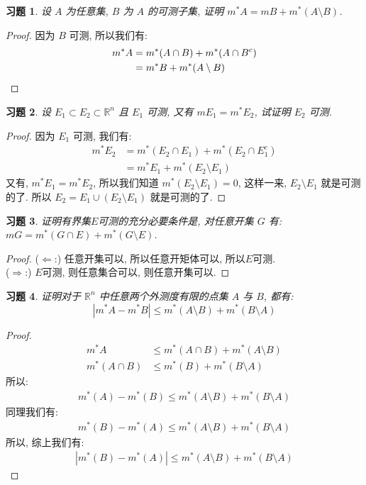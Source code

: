 \documentclass{article}
\newtheorem{exercise}{习题}
\begin{document}
\begin{exercise}
  设 $A$ 为任意集, $B$ 为 $A$ 的可测子集, 证明 $m^*A = mB + m^*(A\setminus B)$.
\end{exercise}
\begin{proof}
  因为 $B$ 可测, 所以我们有:
  \begin{align*}
  m^*A &= m^*(A\cap B) + m^*(A\cap B^c) \\
   &= m^*B + m^*(A\setminus B) \qedhere 
  \end{align*}
\end{proof}
\begin{exercise}
  设 $E_1\subset E_2\subset \mathbb{R}^n$ 且 $E_1$ 可测, 又有 $mE_1 = m^*E_2$, 试证明 $E_2$ 可测.
\end{exercise}
\begin{proof}
  因为 $E_1$ 可测, 我们有:
  \begin{align*}
    m^*E_2 &= m^*(E_2\cap E_1) + m^*(E_2\cap E_1^c) \\
    &= m^*E_1 + m^*(E_2 \setminus E_1)
  \end{align*}
  又有, $m^*E_1 = m^*E_2$, 所以我们知道 $m^*(E_2 \setminus E_1) = 0$, 这样一来,  $E_2 \setminus E_1$ 就是可测的了. 所以 $E_2 = E_1 \cup (E_2 \setminus E_1)$ 就是可测的了.
\end{proof}

\begin{exercise}
  证明有界集$E$可测的充分必要条件是, 对任意开集 $G$ 有:
  $mG = m^*(G\cap E) + m^*(G\setminus E)$.
\end{exercise}
\begin{proof}
  ($\Leftarrow$:) 任意开集可以, 所以任意开矩体可以, 所以$E$可测. \\
  ($\Rightarrow$:) $E$可测, 则任意集合可以, 则任意开集可以.
\end{proof}

\begin{exercise}
  证明对于 $\mathbb{R}^n$ 中任意两个外测度有限的点集 $A$ 与 $B$, 都有:
  \[|m^*A - m^*B| \leq m^*(A\setminus B) + m^*(B\setminus A)\]
\end{exercise}
\begin{proof}
  \begin{align*}
    m^*A &\leq m^*(A\cap B) + m^*(A\setminus B) \\
    m^*(A\cap B) &\leq m^*(B) + m^*(B\setminus A)
  \end{align*}
  所以:
  \begin{align*}
    m^*(A) - m^*(B) \leq m^*(A\setminus B) + m^*(B\setminus A)
  \end{align*}
  同理我们有:
  \begin{align*}
    m^*(B) - m^*(A) \leq m^*(A\setminus B) + m^*(B\setminus A)
  \end{align*}
  所以, 综上我们有:
  \begin{align*}
    |m^*(B) - m^*(A)| \leq m^*(A\setminus B) + m^*(B\setminus A)
  \end{align*}
\end{proof}
\end{document}
